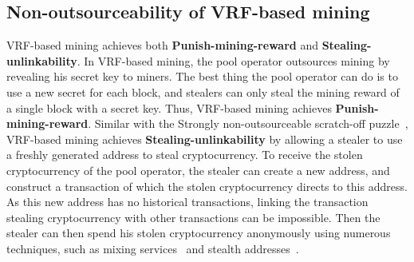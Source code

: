 \subsection{Non-outsourceability of VRF-based mining}

VRF-based mining achieves both \textbf{Punish-mining-reward} and \textbf{Stealing-unlinkability}.
In VRF-based mining, the pool operator outsources mining by revealing his secret key to miners.
The best thing the pool operator can do is to use a new secret for each block, and stealers can only steal the mining reward of a single block with a secret key.
Thus, VRF-based mining achieves \textbf{Punish-mining-reward}.
Similar with the Strongly non-outsourceable scratch-off puzzle~\cite{miller2015nonoutsourceable}, VRF-based mining achieves \textbf{Stealing-unlinkability} by allowing a stealer to use a freshly generated address to steal cryptocurrency.
To receive the stolen cryptocurrency of the pool operator, the stealer can create a new address, and construct a transaction of which the stolen cryptocurrency directs to this address.
As this new address has no historical transactions, linking the transaction stealing cryptocurrency with other transactions can be impossible.
Then the stealer can then spend his stolen cryptocurrency anonymously using numerous techniques, such as mixing services~\cite{maxwell2013coinjoin}\cite{bonneau2014mixcoin}\cite{ruffing2014coinshuffle}\cite{heilman2017tumblebit} and stealth addresses~\cite{van2013cryptonote}.


